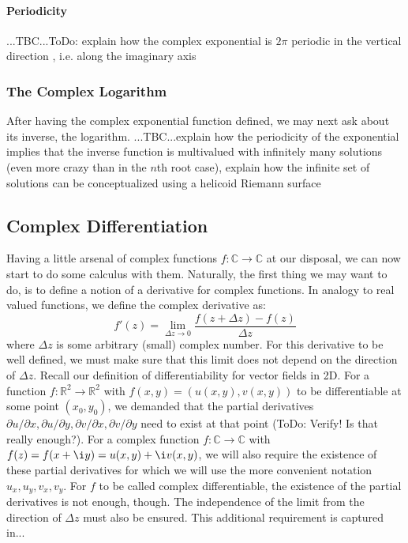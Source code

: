 \paragraph{Periodicity} ...TBC...ToDo: explain how the complex exponential is $2 \pi$ periodic in the vertical direction , i.e. along the imaginary axis



\subsubsection{The Complex Logarithm}
After having the complex exponential function defined, we may next ask about its inverse, the logarithm. ...TBC...explain how the periodicity of the exponential implies that the inverse function is multivalued with infinitely many solutions (even more crazy than in the $n$th root case), explain how the infinite set of solutions can be conceptualized using a helicoid Riemann surface




\subsection{Complex Differentiation}
Having a little arsenal of complex functions $f: \mathbb{C} \rightarrow \mathbb{C}$ at our disposal, we can now start to do some calculus with them. Naturally, the first thing we may want to do, is to define a notion of a derivative for complex functions. In analogy to real valued functions, we define the complex derivative as:
\begin{equation}
  f'(z)	= \lim_{\Delta z \rightarrow 0 }
  \frac{f(z + \Delta z) - f(z)}{\Delta z}
\end{equation}
where $\Delta z$ is some arbitrary (small) complex number. For this derivative to be well defined, we must make sure that this limit does not depend on the direction of $\Delta z$. Recall our definition of differentiability for vector fields in 2D. For a function $f: \mathbb{R}^2 \rightarrow \mathbb{R}^2$ with $f(x,y) = (u(x,y), v(x,y))$ to be differentiable at some point $(x_0, y_0)$, we demanded that the partial derivatives $\partial u / \partial x, \partial u / \partial y, \partial v / \partial x, \partial v / \partial y$ need to exist at that point (ToDo: Verify! Is that really enough?). For a complex function $f: \mathbb{C} \rightarrow \mathbb{C}$ with $f(z) = f(x + \i y) = u(x,y) + \i v(x,y)$, we will also require the existence of these partial derivatives for which we will use the more convenient notation $u_x, u_y, v_x, v_y$. For $f$ to be called complex differentiable, the existence of the partial derivatives is not enough, though. The independence of the limit from the direction of $\Delta z$ must also be ensured. This additional requirement is captured in...

